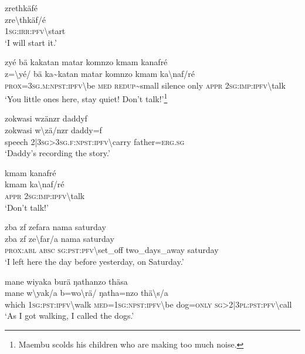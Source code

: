 \ea\label{ex:13:a1265}
zrethkäfé\\
\gll zre{\textbackslash}thkäf/é\\
     1\textsc{sg}:\textsc{irr}:\textsc{pfv}{\textbackslash}start\\
\glt `I will start it.'
\z

\ea\label{ex:13:a1266}
zyé bä kakatan matar komnzo kmam kanafré\\
\gll z={\textbackslash}yé/	bä	ka{\textasciitilde}katan	matar	komnzo	kmam	ka{\textbackslash}naf/ré\\
     \textsc{prox}=3\textsc{sg}.\textsc{m}:\textsc{npst}:\textsc{ipfv}{\textbackslash}be	\textsc{med}	\textsc{redup}{\textasciitilde}small	silence	only	\textsc{appr}	2\textsc{sg}:\textsc{imp}:\textsc{ipfv}{\textbackslash}talk\\
\glt `You little ones here, stay quiet! Don't talk!'\footnote{Maembu scolds his children who are making too much noise.}
\z

\ea\label{ex:13:a1267}
zokwasi wzänzr daddyf\\
\gll zokwasi	w{\textbackslash}zä/nzr	daddy=f\\
     speech	2|3\textsc{sg}>3\textsc{sg}.\textsc{f}:\textsc{npst}:\textsc{ipfv}{\textbackslash}carry	father=\textsc{erg}.\textsc{sg}\\
\glt `Daddy's recording the story.'
\z

\ea\label{ex:13:a1268}
kmam kanafré\\
\gll kmam	ka{\textbackslash}naf/ré\\
     \textsc{appr}	2\textsc{sg}:\textsc{imp}:\textsc{ipfv}{\textbackslash}talk\\
\glt `Don't talk!'
\z

\ea\label{ex:13:a1269}
zba zf zefara nama saturday\\
\gll zba	zf	ze{\textbackslash}far/a	nama	saturday\\
     \textsc{prox}:\textsc{abl}	\textsc{absc}	\textsc{sg}:\textsc{pst}:\textsc{pfv}{\textbackslash}set\_off	two\_days\_away	saturday\\
\glt `I left here the day before yesterday, on Saturday.'
\z

\ea\label{ex:13:a1271}
mane wiyaka burä ŋathanzo thäsa\\
\gll mane	w{\textbackslash}yak/a	b=wo{\textbackslash}rä/	ŋatha=nzo	thä{\textbackslash}s/a\\
     which	1\textsc{sg}:\textsc{pst}:\textsc{ipfv}{\textbackslash}walk	\textsc{med}=1\textsc{sg}:\textsc{npst}:\textsc{ipfv}{\textbackslash}be	dog=\textsc{only}	\textsc{sg}>2|3\textsc{pl}:\textsc{pst}:\textsc{pfv}{\textbackslash}call\\
\glt `As I got walking, I called the dogs.'
\z


